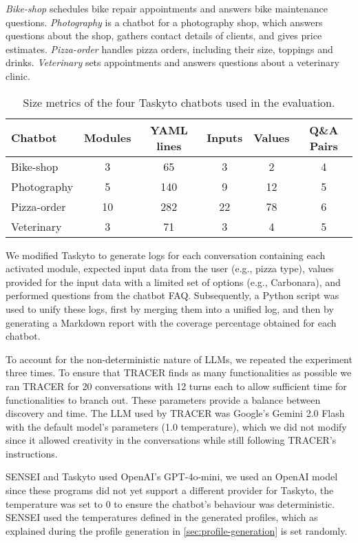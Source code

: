 \textit{Bike-shop} schedules bike repair appointments
and answers bike maintenance questions.
\textit{Photography} is a chatbot for a photography shop,
which answers questions about the shop,
gathers contact details of clients, and gives price estimates.
\textit{Pizza-order} handles pizza orders,
including their size, toppings and drinks.
\textit{Veterinary} sets appointments and answers questions about a veterinary clinic.

\begin{table}[htpb]
\centering
\caption{Size metrics of the four Taskyto chatbots used in the evaluation.}
\label{tab:rq1_chatbots}
\begin{tabular}{@{}lccccc@{}}
\toprule
\textbf{Chatbot} & \textbf{Modules} & \textbf{YAML lines} & \textbf{Inputs} & \textbf{Values} & \textbf{Q\&A Pairs} \\ \midrule
Bike-shop & 3 & 65 & 3 & 2 & 4 \\
Photography & 5 & 140 & 9 & 12 & 5 \\
Pizza-order & 10 & 282 & 22 & 78 & 6 \\
Veterinary & 3 & 71 & 3 & 4 & 5 \\ \bottomrule
\end{tabular}
\end{table}

We modified Taskyto to generate logs
for each conversation containing
each activated module,
expected input data from the user (e.g., pizza type),
values provided for the input data with a limited set of options (e.g., Carbonara),
and performed questions from the chatbot FAQ.
Subsequently, a Python script was used to unify these logs,
first by merging them into a unified log,
and then by generating a Markdown report
with the coverage percentage obtained for each chatbot.

To account for the non-deterministic nature of \acp{LLM},
we repeated the experiment three times.
To ensure that \ac{TRACER} finds as many functionalities as possible
we ran TRACER for 20 conversations with 12 turns each
to allow sufficient time for functionalities to branch out.
These parameters provide a balance between discovery and time.
The \ac{LLM} used by \ac{TRACER} was Google's Gemini 2.0 Flash
with the default model's parameters (1.0 temperature),
which we did not modify since it allowed creativity in the conversations
while still following \ac{TRACER}'s instructions.

SENSEI and Taskyto used OpenAI's GPT-4o-mini,
we used an OpenAI model
since these programs did not yet support a different provider
for Taskyto, the temperature was set to 0
to ensure the chatbot's behaviour was deterministic.
SENSEI used the temperatures defined in the generated profiles,
which as explained during the profile generation in \autoref{sec:profile-generation}
is set randomly.

